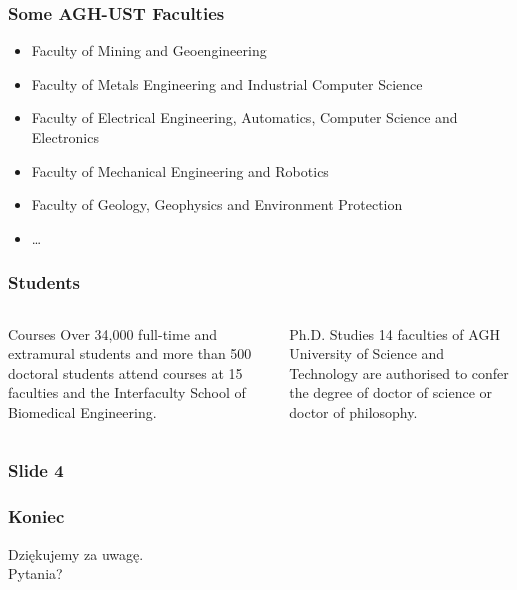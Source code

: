 \documentclass{beamer}
\begin{document}
\begin{frame}
\frametitle{Some AGH-UST Faculties}

\begin{itemize}
\item Faculty of Mining and Geoengineering
\item Faculty of Metals Engineering and Industrial Computer Science
\item Faculty of Electrical Engineering, Automatics, Computer Science and Electronics
\item Faculty of Mechanical Engineering and Robotics
\item Faculty of Geology, Geophysics and Environment Protection
\item \dots
\end{itemize}

\end{frame}



\begin{frame}
\frametitle{Students}

\begin{columns}
\begin{block}{Courses}
Over 34,000 full-time and extramural students and more than 500 doctoral students attend courses at 15 faculties and the Interfaculty School of Biomedical Engineering.
\end{block}
\begin{block}{Ph.D. Studies}
14 faculties of AGH University of Science and Technology are authorised to confer the degree of doctor of science or doctor of philosophy.
\end{block}
\end{columns}

\end{frame}


\begin{frame}
\frametitle{Slide 4}



\end{frame}


\begin{frame}
\frametitle{Koniec}

\begin{block}{}
Dziękujemy za uwagę.\\
Pytania?
\end{block}


\end{frame}

\end{document}

